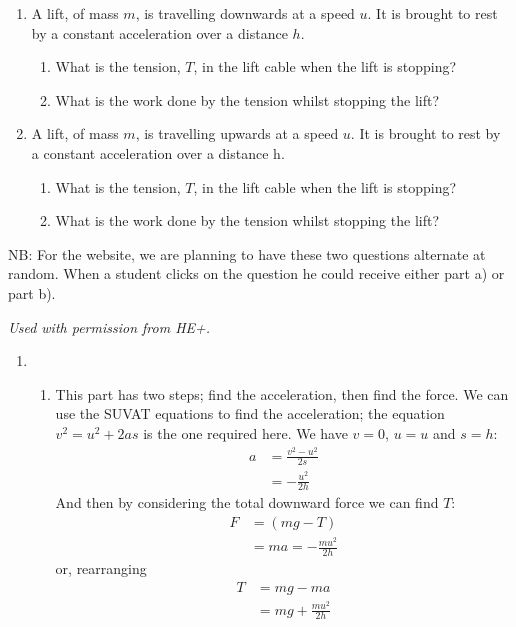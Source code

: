 \begin{problem}[HE+_Lift]%
{\begin{enumerate}
\item A lift, of  mass $m$, is travelling downwards at a speed $u$. It is brought to rest by a constant acceleration over a distance $h$. 
\begin{enumerate} 
	\item What is the tension, $T$, in the lift cable when the lift is stopping?
	\item What is the work done by the tension whilst stopping the lift?
\end{enumerate}
\item A lift, of mass $m$, is travelling upwards at a speed $u$. It is brought to rest by a constant acceleration over a distance h. 
\begin{enumerate}
	\item What is the tension, $T$, in the lift cable when the lift is stopping?
	\item What is the work done by the tension whilst stopping the lift?
\end{enumerate}
\end{enumerate}
NB: For the website, we are planning to have these two questions alternate at random. When a student clicks on the question he could receive either part a) or part b).
}
{\textit{Used with permission from HE+.}}
{\begin{enumerate}
\item
\begin{enumerate}
	\item This part has two steps; find the acceleration, then find the force. We can use the SUVAT equations to find the acceleration; the equation $v^{2} = u^{2} + 2as$ is the one required here. We have $v = 0$, $u = u$ and $s = h$:
\begin{align*} a &= \frac{v^{2} - u^{2}}{2s} \\ &= -\frac{u^{2}}{2h} \end{align*}
And then by considering the total downward force we can find $T$:
\begin{align*} F &= (mg - T) \\ &= ma = -\frac{mu^{2}}{2h} \end{align*}
or, rearranging \begin{align*} T &= mg - ma \\ &= mg + \frac{mu^{2}}{2h} \end{align*}

\end{enumerate}
\end{enumerate}}
\end{problem}

